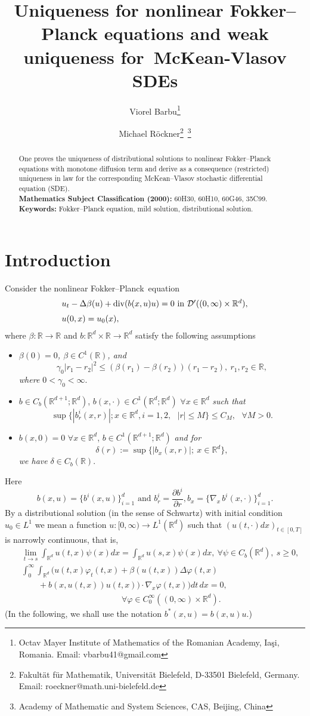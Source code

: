 \documentclass[12pt]{article}
\title{Uniqueness for nonlinear Fokker--Planck equations and weak uniqueness for~McKean-Vlasov SDEs}
\author{Viorel Barbu\thanks{Octav Mayer Institute of Mathematics of the Romanian Academy,     Ia\c si, Romania.  Email: vbarbu41@gmail.com}\and Michael R\"ockner\thanks{Fakult\"at f\"ur Mathematik, Universit\"at Bielefeld,  D-33501 Bielefeld, Germany.  Email: roeckner@math.uni-bielefeld.de}\ \thanks{Academy of Mathematic and System Sciences, CAS, Beijing, China}}
\date{}
\def\rrd{{\rr^d}}
\def\cald{{\mathcal{D}}}
\def\vsp{\vspace*{1,5mm}\\ }
\def\sk{\smallskip }
\def\n{\noindent }
\def\dd{\displaystyle}
\def\D{{\Delta}}
\def\barr{\begin{array}}
\def\earr{\end{array}}
\def\D{{\Delta}}
\def\FP{Fokker--Planck}
\theoremstyle{definition}
\def\vsp{\vspace*{2mm}\\ }
\def\rr{{\mathbb{R}}}
\def\9{{\infty}}
\def\b{{\beta}}
\def\g{{\gamma}}
\def\vf{{\varphi}}
\def\pp{{\partial}}
\def\D{{\Delta}}
\def\barr{\begin{array}}
\def\earr{\end{array}}
\def\dd{\displaystyle}
\def\sk{\smallskip}
\def\n{\noindent }
\def\vsp{\vspace*{2mm}\\ }
\def\ff{\forall }
\begin{document}
\maketitle
\begin{abstract}
\n One proves the uniqueness of distributional solutions to  nonlinear Fokker--Planck equations with monotone diffusion term and derive as a  consequence (restricted) uniqueness in law for the correspon\-ding  McKean--Vlasov stochastic differential equation (SDE).\sk\\
{\bf Mathematics Subject Classification (2000):} 60H30, 60H10, 60G46, 35C99.\\
{\bf Keywords:} Fokker--Planck  equation, mild solution, distributional solution.   
\end{abstract}

\section{Introduction}\label{s1}

Consider  the nonlinear \FP\ equation  
\begin{equation}\label{e1.1}
\barr{ll}
u_t-\Delta\beta(u)+{\rm div}(b(x,u)u)=0\mbox{ in }\cald'((0,\9)\times\rr^d),\vsp 
u(0,x)=u_0(x),
\earr\end{equation}
where $\b:\rr\to\rr$ and $b:\rrd\times\rr\to\rrd$ satisfy  the following assumptions
\begin{itemize}
	\item[(i)] {\it$\beta(0)=0$, $\b\in C^1(\rr)$, and 
		\begin{equation}
		\g_0|r_1-r_2|^2\le(\b(r_1)-\b(r_2))(r_1-r_2),\ r_1,r_2\in\rr,\label{e1.2}
			\end{equation}
	where $0<\g_0<\9.$	}
	\item[(ii)] $b\in C_b(\mathbb R^{d+1}; \rrd)$, $b(x, \cdot) \in C^1(\rrd; \rrd)$ $ \forall x\in\rrd$ {\it such that}  $$\mbox{$\sup\{|b^i_r(x,r)|;x\in\rrd,i=1,2,$ $|r|\le M\}\le C_M,$ $\ff M>0.$}$$
	\item[(ii')] $b(x,0)=0$ $\forall x\in\rrd$, $b \in C^1(\mathbb R^{d+1}; \rrd) $ {\it and for
		$$\delta(r):=\sup\{|b_x(x,r)|;\ x\in\rrd\},$$we have} $\delta\in   C_b(\rr).$
\end{itemize}
Here$$b(x,u)=\{b^i(x,u)\}^d_{i=1}\mbox{ and }b^i_r=\frac{\pp b^i}{\pp r}, b_x=\big\{ \nabla_x \, b^i(x, \cdot) \big\}_{i=1}^d.$$
By a distributional solution (in the sense of Schwartz) with initial condition $u_0\in L^1$ we mean a function $u:[0,\9)\to L^1(\rrd)$ such that
$(u(t,\cdot)dx)_{t\in[0,T]}$ is narrowly continuous, that is,
\begin{eqnarray}
&&\lim_{t\to s}\int_{\rrd}u(t,x)\psi(x)dx=\int_{\rrd}u(s,x)\psi(x)dx,\ \ff\psi\in C_b(\rrd),\ s\ge0,\qquad\label{e1.3}\\[2mm]
&&\dd\int^\9_0\int_{\rr^d}(u(t,x)\vf_t(t,x)+\b(u(t,x))\D\vf(t,x)\label{e1.4}\\
&&\qquad+b(x,u(t,x))u(t,x))\cdot\nabla_x\vf(t,x))dt\,dx=0,\nonumber\\
&&\qquad\qquad\qquad\qquad\qquad\qquad\ff\vf\in C^\9_0((0,\9)\times\rr^d).\nonumber
\end{eqnarray}
(In the following, we shall use the notation $b^*(x,u)=b(x,u)u.$)
\end{document}
